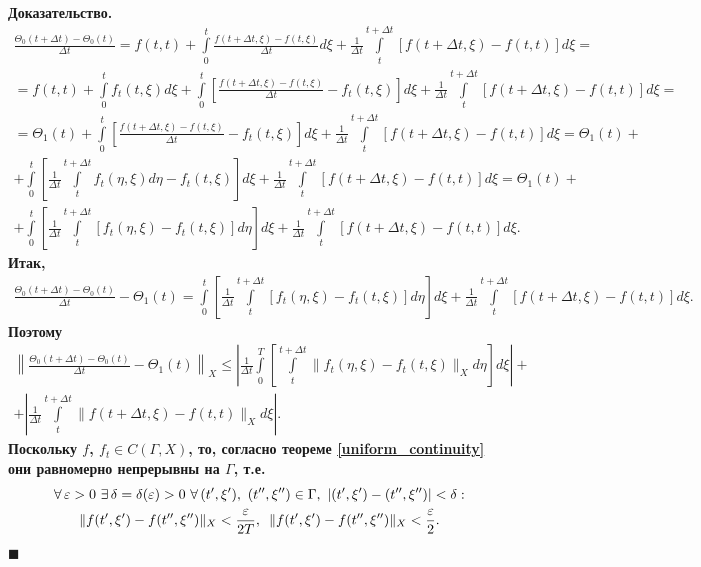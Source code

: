 \documentclass{report}
\newenvironment{Proof}{\par\noindent\bf Доказательство.\rm}{ $\blacksquare$\par}
\begin{document}
\begin{Proof}
\begin{gather*}
\frac{\Theta_0(t+\Delta t)-\Theta_0(t)}{\Delta t}=f(t,t)+\int\limits_0^{t}\frac{f(t+\Delta t,\xi)-f(t,\xi)}{\Delta t}d\xi+\frac1{\Delta t}
\int\limits_t^{t+\Delta t}[f(t+\Delta t,\xi)-f(t,t)]d\xi=\\
=f(t,t)+\int\limits_0^{t}f_t(t,\xi)d\xi+\int\limits_0^{t}\left[\frac{f(t+\Delta t,\xi)-f(t,\xi)}{\Delta t}-f_t(t,\xi)\right]d\xi+
\frac1{\Delta t}\int\limits_t^{t+\Delta t}[f(t+\Delta t,\xi)-f(t,t)]d\xi=\\
=\Theta_1(t)+\int\limits_0^{t}\left[\frac{f(t+\Delta t,\xi)-f(t,\xi)}{\Delta t}-f_t(t,\xi)\right]d\xi+\frac1{\Delta t}\int\limits_t^{t+\Delta t}[f(t+\Delta t,\xi)-f(t,t)]d\xi=\Theta_1(t)+\\
+\int\limits_0^{t}\left[\frac1{\Delta t}\int\limits_t^{t+\Delta t}f_t(\eta,\xi)d\eta-f_t(t,\xi)\right]d\xi+
\frac1{\Delta t}\int\limits_t^{t+\Delta t}[f(t+\Delta t,\xi)-f(t,t)]d\xi=\Theta_1(t)+\\
+\int\limits_0^{t}\left[\frac1{\Delta t}\int\limits_t^{t+\Delta t}[f_t(\eta,\xi)-f_t(t,\xi)]d\eta\right]d\xi+\frac1{\Delta t}\int\limits_t^{t+\Delta t}[f(t+\Delta t,\xi)-f(t,t)]d\xi.
\end{gather*}
Итак,
\begin{gather*}
\frac{\Theta_0(t+\Delta t)-\Theta_0(t)}{\Delta t}-\Theta_1(t)= \int\limits_0^{t}\left[\frac1{\Delta t}\int\limits_t^{t+\Delta t}[f_t(\eta,\xi)-f_t(t,\xi)]d\eta\right]d\xi+
\frac1{\Delta t}\int\limits_t^{t+\Delta t}\!\![f(t+\Delta t,\xi)-f(t,t)]d\xi.
\end{gather*}
Поэтому
\begin{gather*}
\left\|\frac{\Theta_0(t+\Delta t)-\Theta_0(t)}{\Delta t}-\Theta_1(t)\right\|_X\leqslant
\left|\frac1{\Delta t}\int\limits_0^{T}\left[\int\limits_t^{t+\Delta t}\|f_t(\eta,\xi)-f_t(t,\xi)\|_Xd\eta\right]d\xi\right|+\\
+\left|\frac1{\Delta t}\int\limits_t^{t+\Delta t}\|f(t+\Delta t,\xi)-f(t,t)\|_Xd\xi\right|.
\end{gather*}
Поскольку $f$, $f_t\in C(\Gamma,X)$, то, согласно теореме \ref{uniform_continuity} они равномерно непрерывны на $\Gamma$, т.е.
\begin{gather}\label{fftucontinuityDelta}
\forall\,\varepsilon>0\,\,\exists\,\delta=\delta(\varepsilon)>0\,\,\forall\,(t',\xi'),\,\,(t'',\xi'')\in\Gamma,\,\,|(t',\xi')-(t'',\xi'')|<\delta:\\
\notag\|f(t',\xi')-f(t'',\xi'')\|_X<\frac\varepsilon{2T},\,\,\,\|f(t',\xi')-f(t'',\xi'')\|_X<\frac\varepsilon{2}.
\end{gather}

\end{Proof}
\end{document}
